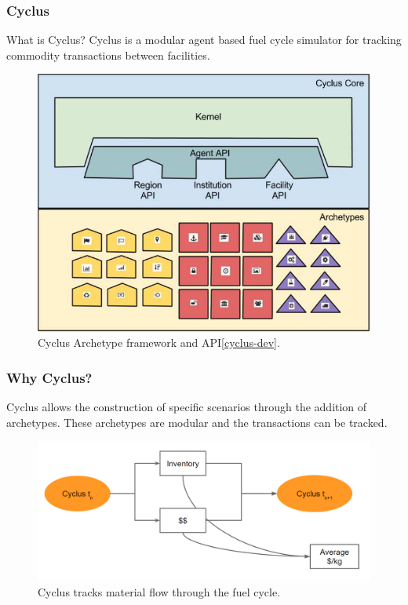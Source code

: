 \begin{frame}
	\frametitle{Cyclus}
    \begin{block}{What is Cyclus?}
    	Cyclus is a modular agent based fuel cycle simulator for tracking commodity transactions
    	between facilities.
    \end{block}
	\begin{figure}
		\centering
		\includegraphics[width=0.6\linewidth]{Cyclus_graph}
		\caption{Cyclus Archetype framework and API\ref{cyclus-dev}.}
	\end{figure}
\end{frame}

\begin{frame}
\frametitle{Why Cyclus?}
	Cyclus allows the construction of specific scenarios through the addition of archetypes. These archetypes are
	modular and the transactions can be tracked.
	\begin{figure}
		\centering
		\includegraphics[width=0.9\linewidth]{cyclus-material-track}
		\caption{Cyclus tracks material flow through the fuel cycle.}
		\label{fig:tracking}
	\end{figure}
\end{frame}

